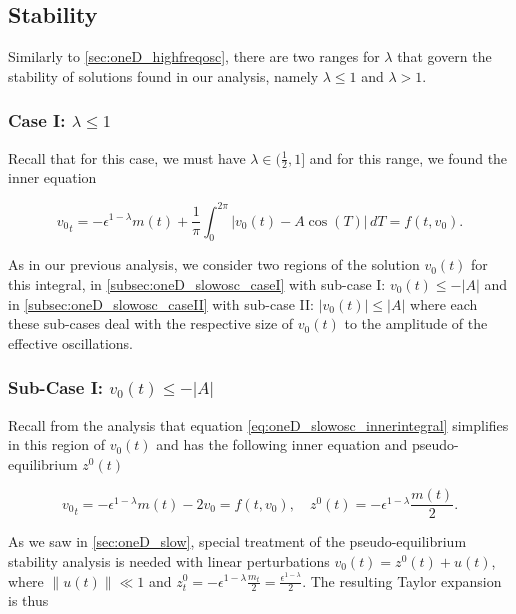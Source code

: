 \subsection{Stability}

Similarly to \autoref{sec:oneD_highfreqosc}, there are two ranges for $\lambda$ that govern the stability of solutions found in our analysis, namely $\lambda\le 1$ and $\lambda>1$.

\subsubsection{Case I: $\lambda\le 1$}

Recall that for this case, we must have $\lambda\in (\frac{1}{2},1]$ and for this range, we found the inner equation

\begin{equation}\label{eq:oneD_slowosc_innerintegral}
{v_0}_t= -\epsilon^{1-\lambda}m(t)+\frac{1}{\pi}\int_0^{2\pi}| v_0(t)- A\cos(T)|\,dT=f(t,v_0).
\end{equation}

As in our previous analysis, we consider two regions of the solution $v_0(t)$ for this integral, in \autoref{subsec:oneD_slowosc_caseI} with sub-case I: $v_0(t)\le - |A|$ and in \autoref{subsec:oneD_slowosc_caseII} with sub-case II: $|v_0(t)|\le |A|$ where each these sub-cases deal with the respective size of $v_0(t)$ to the amplitude of the effective oscillations.

\subsubsection*{Sub-Case I: $v_0(t)\le - |A|$}

Recall from the analysis that equation \eqref{eq:oneD_slowosc_innerintegral} simplifies in this region of $v_0(t)$ and has the following inner equation and pseudo-equilibrium $z^0(t)$

\begin{equation}\label{eq:oneD_slowosc_stabilitysubcaseI}
{v_0}_t= -\epsilon^{1-\lambda}m(t) -2v_0=f(t,v_0), \quad z^0(t)=-\epsilon^{1-\lambda}\frac{m(t)}{2}.
\end{equation}

As we saw in \autoref{sec:oneD_slow}, special treatment of the pseudo-equilibrium stability analysis is needed with linear perturbations $v_0(t)=z^0(t)+u(t)$, where $\lVert u(t)\rVert \ll 1$ and $z^0_t = -\epsilon^{1-\lambda}\frac{m_t}{2}=\frac{\epsilon^{1-\lambda}}{2}$. The resulting Taylor expansion is thus

